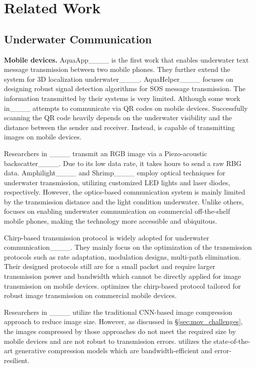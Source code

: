 \section{Related Work}
\label{sec:related_work}

\subsection{Underwater Communication}
\noindent\textbf{Mobile devices.} AquaApp____ is the first work that enables underwater text message transmission between two mobile phones. They further extend the system for 3D localization underwater____.
AquaHelper____ focuses on designing robust signal detection algorithms for SOS message transmission.
The information transmitted by their systems is very limited.
Although some work in____ attempts to communicate via QR codes on mobile devices. Successfully scanning the QR code heavily depends on the underwater visibility and the distance between the sender and receiver. Instead, \sysname is capable of transmitting images on mobile devices.


Researchers in ____ transmit an RGB image via a Piezo-acoustic backscatter____. Due to its low data rate, it takes hours to send a raw RBG data.
Amphilight____ and Shrimp____ employ optical techniques for underwater transmission, utilizing customized LED lights and laser diodes, respectively. However, the optics-based communication system is mainly limited by the transmission distance and the light condition underwater.
Unlike others, \sysname focuses on enabling underwater communication on commercial off-the-shelf mobile phones, making the technology more accessible and ubiquitous.




Chirp-based transmission protocol is widely adopted for underwater communication____. They mainly focus on the optimization of the transmission protocols such as rate adaptation, modulation designs, multi-path elimination. Their designed protocols still are for a small packet and require larger transmission power and bandwidth which cannot be directly applied for image transmission on mobile devices.
\sysname optimizes the chirp-based protocol tailored for robust image transmission on commercial mobile devices.

Researchers in ____ utilize the traditional CNN-based image compression approach to reduce image size. However, as discussed in \S\ref{sec:mov_challenges}, the images compressed by those approaches do not meet the required size by mobile devices and are not robust to transmission errors. \sysname utilizes the state-of-the-art generative compression models which are bandwidth-efficient and error-resilient.











